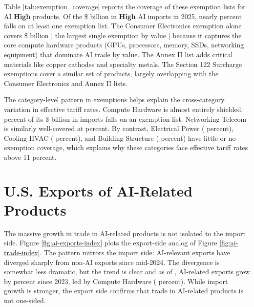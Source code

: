 \documentclass[12pt,pdftex]{article}
\begin{document}
\begin{onehalfspacing}
\afterpage{%
\clearpage

}

Table \ref{tab:exemption_coverage} reports the coverage of these exemption lists for AI \textbf{High} products. Of the \$\highAiTwentyFive{} billion in \textbf{High} AI imports in 2025, nearly \exemptionAnyPct{} percent falls on at least one exemption list. The Consumer Electronics exemption alone covers \$\exemptionCEDollars{} billion | the largest single exemption by value | because it captures the core compute hardware products (GPUs, processors, memory, SSDs, networking equipment) that dominate AI trade by value. The Annex II list adds critical materials like copper cathodes and specialty metals. The Section 122 Surcharge exemptions cover a similar set of products, largely overlapping with the Consumer Electronics and Annex II lists.

The category-level pattern in exemptions helps explain the cross-category variation in effective tariff rates. Compute Hardware is almost entirely shielded: \exemptionComputeHardwarePct{} percent of its \$\ComputeHardwareTwentyFive{} billion in imports falls on an exemption list. Networking Telecom is similarly well-covered at \exemptionNetworkingTelecomPct{} percent. By contrast, Electrical Power (\exemptionElectricalPowerPct{} percent), Cooling HVAC (\exemptionCoolingHVACPct{} percent), and Building Structure (\exemptionBuildingStructurePct{} percent) have little or no exemption coverage, which explains why these categories face effective tariff rates above 11 percent.

\section{U.S. Exports of AI-Related Products}\label{sec:facts-exports}

The massive growth in trade in AI-related products is not isolated to the import side. Figure \ref{fig:ai-exports-index} plots the export-side analog of Figure \ref{fig:ai-trade-index}. The pattern mirrors the import side: AI-relevant exports have diverged sharply from non-AI exports since mid-2024. The divergence is somewhat less dramatic, but the trend is clear and as of \lastObsDate{}, AI-related exports grew by \aiExportGrowth{} percent since 2023, led by Compute Hardware (\computeHardwareExportGrowth{} percent). While import growth is stronger, the export side confirms that trade in AI-related products is not one-sided.


\end{onehalfspacing}
\end{document}
